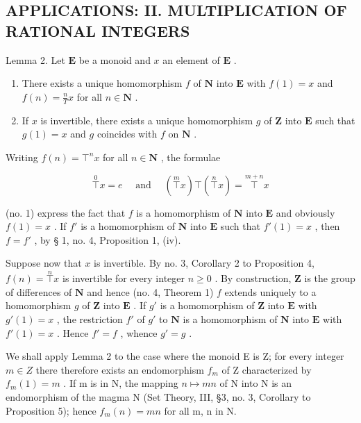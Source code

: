 \subsection{APPLICATIONS: II. MULTIPLICATION OF RATIONAL INTEGERS}

Lemma 2. Let \(\mathbf{E}\) be a monoid and \(x\) an element of \(\mathbf{E}\) .

\begin{enumerate}
\def\labelenumi{(\roman{enumi})}
\item
  There exists a unique homomorphism \(f\) of \(\mathbf{N}\) into \(\mathbf{E}\) with \(f(1) = x\) and \(f(n) = \frac{n}{T} x\) for all \(n \in \mathbf{N}\) .
\item
  If \(x\) is invertible, there exists a unique homomorphism \(g\) of \(\mathbf{Z}\) into \(\mathbf{E}\) such that \(g(1) = x\) and \(g\) coincides with \(f\) on \(\mathbf{N}\) .
\end{enumerate}

Writing \(f(n) = \top^n x\) for all \(n \in \mathbf{N}\) , the formulae

\[
\overset {0} {\top} x = e \quad \text { and } \quad \left(\overset {m} {\top} x\right) \top \left(\overset {n} {\top} x\right) = \overset {m + n} {\top} x
\]

(no. 1) express the fact that \(f\) is a homomorphism of \(\mathbf{N}\) into \(\mathbf{E}\) and obviously \(f(1) = x\) . If \(f'\) is a homomorphism of \(\mathbf{N}\) into \(\mathbf{E}\) such that \(f'(1) = x\) , then \(f = f'\) , by § 1, no. 4, Proposition 1, (iv).

Suppose now that \(x\) is invertible. By no. 3, Corollary 2 to Proposition 4, \(f(n) = \overset{n}{\top} x\) is invertible for every integer \(n \geqslant 0\) . By construction, \(\mathbf{Z}\) is the group of differences of \(\mathbf{N}\) and hence (no. 4, Theorem 1) \(f\) extends uniquely to a homomorphism \(g\) of \(\mathbf{Z}\) into \(\mathbf{E}\) . If \(g'\) is a homomorphism of \(\mathbf{Z}\) into \(\mathbf{E}\) with \(g'(1) = x\) , the restriction \(f'\) of \(g'\) to \(\mathbf{N}\) is a homomorphism of \(\mathbf{N}\) into \(\mathbf{E}\) with \(f'(1) = x\) . Hence \(f' = f\) , whence \(g' = g\) .

We shall apply Lemma 2 to the case where the monoid E is Z; for every integer \(m \in Z\) there therefore exists an endomorphism \(f_{m}\) of Z characterized by \(f_{m}(1) = m\) . If m is in N, the mapping \(n \mapsto mn\) of N into N is an endomorphism of the magma N (Set Theory, III, §3, no. 3, Corollary to Proposition 5); hence \(f_{m}(n) = mn\) for all m, n in N.

